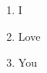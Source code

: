 
\begin{projects}

\begin{enumerate}
  \item I
  \item Love
  \item You
\end{enumerate}

\end{projects}

